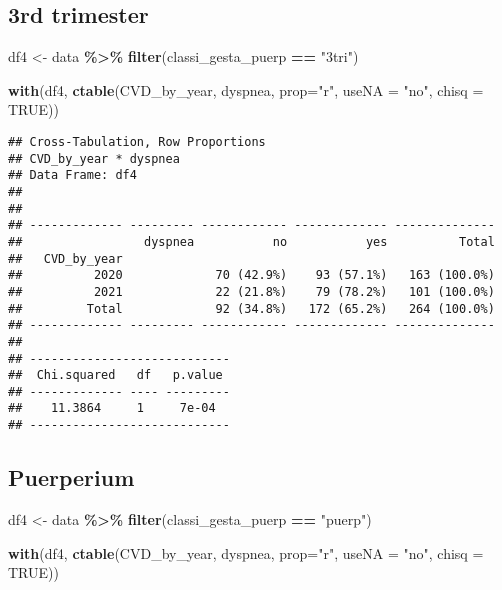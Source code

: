 \documentclass[
]{article}
\newenvironment{Shaded}{\begin{snugshade}}{\end{snugshade}}
\newcommand{\AttributeTok}[1]{\textcolor[rgb]{0.13,0.29,0.53}{#1}}
\newcommand{\ConstantTok}[1]{\textcolor[rgb]{0.56,0.35,0.01}{#1}}
\newcommand{\FunctionTok}[1]{\textcolor[rgb]{0.13,0.29,0.53}{\textbf{#1}}}
\newcommand{\NormalTok}[1]{#1}
\newcommand{\OtherTok}[1]{\textcolor[rgb]{0.56,0.35,0.01}{#1}}
\newcommand{\SpecialCharTok}[1]{\textcolor[rgb]{0.81,0.36,0.00}{\textbf{#1}}}
\newcommand{\StringTok}[1]{\textcolor[rgb]{0.31,0.60,0.02}{#1}}
\begin{document}
\hypertarget{rd-trimester}{%
\subsection{3rd trimester}\label{rd-trimester}}

\begin{Shaded}
\begin{Highlighting}[]
\NormalTok{df4 }\OtherTok{\textless{}{-}}\NormalTok{ data }\SpecialCharTok{\%\textgreater{}\%} 
  \FunctionTok{filter}\NormalTok{(classi\_gesta\_puerp }\SpecialCharTok{==} \StringTok{"3tri"}\NormalTok{)}

\FunctionTok{with}\NormalTok{(df4, }\FunctionTok{ctable}\NormalTok{(CVD\_by\_year, dyspnea, }\AttributeTok{prop=}\StringTok{"r"}\NormalTok{, }\AttributeTok{useNA =} \StringTok{"no"}\NormalTok{, }\AttributeTok{chisq =} \ConstantTok{TRUE}\NormalTok{))}
\end{Highlighting}
\end{Shaded}

\begin{verbatim}
## Cross-Tabulation, Row Proportions  
## CVD_by_year * dyspnea  
## Data Frame: df4  
## 
## 
## ------------- --------- ------------ ------------- --------------
##                 dyspnea           no           yes          Total
##   CVD_by_year                                                    
##          2020             70 (42.9%)    93 (57.1%)   163 (100.0%)
##          2021             22 (21.8%)    79 (78.2%)   101 (100.0%)
##         Total             92 (34.8%)   172 (65.2%)   264 (100.0%)
## ------------- --------- ------------ ------------- --------------
## 
## ----------------------------
##  Chi.squared   df   p.value 
## ------------- ---- ---------
##    11.3864     1     7e-04  
## ----------------------------
\end{verbatim}

\hypertarget{puerperium}{%
\subsection{Puerperium}\label{puerperium}}

\begin{Shaded}
\begin{Highlighting}[]
\NormalTok{df4 }\OtherTok{\textless{}{-}}\NormalTok{ data }\SpecialCharTok{\%\textgreater{}\%} 
  \FunctionTok{filter}\NormalTok{(classi\_gesta\_puerp }\SpecialCharTok{==} \StringTok{"puerp"}\NormalTok{)}

\FunctionTok{with}\NormalTok{(df4, }\FunctionTok{ctable}\NormalTok{(CVD\_by\_year, dyspnea, }\AttributeTok{prop=}\StringTok{"r"}\NormalTok{, }\AttributeTok{useNA =} \StringTok{"no"}\NormalTok{, }\AttributeTok{chisq =} \ConstantTok{TRUE}\NormalTok{))}
\end{Highlighting}
\end{Shaded}
\end{document}
